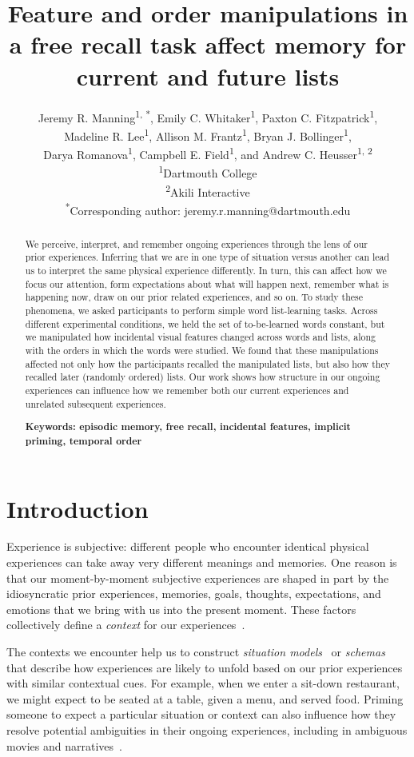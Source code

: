 \documentclass[11pt]{article}
\title{\Large Feature and order manipulations in a free recall task affect memory for current and future lists}
\author{Jeremy R. Manning\textsuperscript{1, *}, Emily C.
Whitaker\textsuperscript{1}, Paxton C. Fitzpatrick\textsuperscript{1},
\\Madeline R. Lee\textsuperscript{1}, Allison M. Frantz\textsuperscript{1},
Bryan J. Bollinger\textsuperscript{1},\\Darya Romanova\textsuperscript{1},
Campbell E. Field\textsuperscript{1}, and Andrew C. Heusser\textsuperscript{1,
2}\\\textsuperscript{1}Dartmouth College\\\textsuperscript{2}Akili
Interactive\\\textsuperscript{*}Corresponding author:
jeremy.r.manning@dartmouth.edu}
\date{}
\begin{document}
\maketitle

\begin{abstract} \footnotesize{We perceive, interpret, and remember ongoing
experiences through the lens of our prior experiences. Inferring that we are in
one type of situation versus another can lead us to interpret the same physical
experience differently. In turn, this can affect how we focus our attention,
form expectations about what will happen next, remember what is happening now,
draw on our prior related experiences, and so on. To study these phenomena, we
asked participants to perform simple word list-learning tasks. Across different
experimental conditions, we held the set of to-be-learned words constant, but
we manipulated how incidental visual features changed across words and lists,
along with the orders in which the words were studied. We found that these
manipulations affected not only how the participants recalled the manipulated
lists, but also how they recalled later (randomly ordered) lists. Our work
shows how structure in our ongoing experiences can influence how we remember
both our current experiences and unrelated subsequent experiences.

\textbf{Keywords: episodic memory, free recall, incidental features, implicit
priming, temporal order}}

\end{abstract}


\section*{Introduction}


Experience is subjective: different people who encounter identical physical
experiences can take away very different meanings and memories. One reason is
that our moment-by-moment subjective experiences are shaped in part by the
idiosyncratic prior experiences, memories, goals, thoughts, expectations, and
emotions that we bring with us into the present moment. These factors
collectively define a \textit{context} for our experiences~\citep{Mann20}.


The contexts we encounter help us to construct \textit{situation
models}~\citep{RangRitc12, MannEtal15, RadvCope06, ZwaaEtal95, ZwaaRadv98} or
\textit{schemas}~\citep{MasiEtal22, BaldEtal18, TseEtal07} that describe how
experiences are likely to unfold based on our prior experiences with similar
contextual cues. For example, when we enter a sit-down restaurant, we might
expect to be seated at a table, given a menu, and served food. Priming someone
to expect a particular situation or context can also influence how they resolve
potential ambiguities in their ongoing experiences, including in ambiguous
movies and narratives~\citep{YeshEtal17, RissEtal03}.
\end{document}
